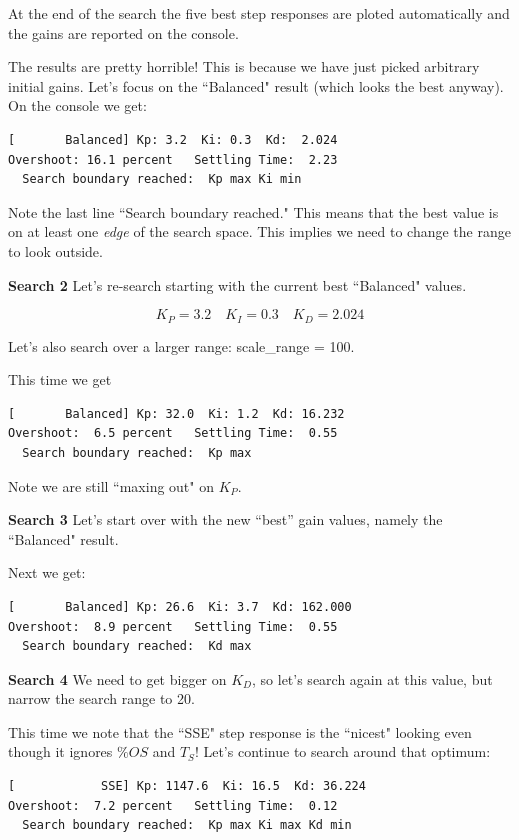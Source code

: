 At the end of the search the five best step responses are ploted automatically and the gains are reported on the console.



The results are pretty horrible!   This is because we have just picked arbitrary initial gains.  Let's focus on the ``Balanced" result (which looks the best anyway). On the console we get:


\begin{verbatim}
[       Balanced] Kp: 3.2  Ki: 0.3  Kd:  2.024
Overshoot: 16.1 percent   Settling Time:  2.23
  Search boundary reached:  Kp max Ki min
\end{verbatim}


Note the last line ``Search boundary reached."  This means that the best value is on at least one {\it edge} of the search space.  This implies we need to change the range to look outside.



{\bf Search 2}
Let's re-search starting with the current best ``Balanced" values.

\[
K_P = 3.2\quad K_I = 0.3 \quad K_D = 2.024
\]

Let's also search over a larger range:  scale\_range = 100.


This time we get


\begin{verbatim}
[       Balanced] Kp: 32.0  Ki: 1.2  Kd: 16.232
Overshoot:  6.5 percent   Settling Time:  0.55
  Search boundary reached:  Kp max
\end{verbatim}

Note we are still ``maxing out" on $K_P$.


{\bf Search 3} Let's start over with the new ``best'' gain values, namely the ``Balanced" result.


Next we get:
\begin{verbatim}
[       Balanced] Kp: 26.6  Ki: 3.7  Kd: 162.000
Overshoot:  8.9 percent   Settling Time:  0.55
  Search boundary reached:  Kd max
\end{verbatim}


{\bf Search 4}  We need to get bigger on $K_D$, so let's search again at this value, but narrow the search range to 20.


This time we note that the ``SSE" step response is the ``nicest" looking even though it ignores $\%OS$ and $T_S$!  Let's continue to search around that optimum:


\begin{verbatim}
[            SSE] Kp: 1147.6  Ki: 16.5  Kd: 36.224
Overshoot:  7.2 percent   Settling Time:  0.12
  Search boundary reached:  Kp max Ki max Kd min
\end{verbatim}

